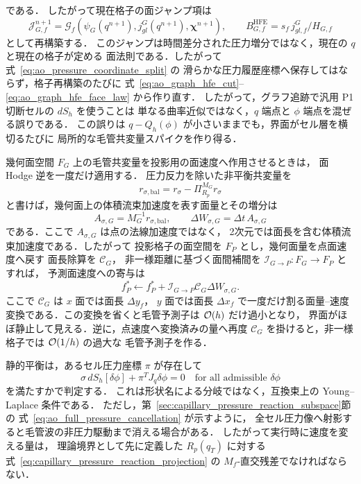 である．
したがって現在格子の面ジャンプ項は
\begin{equation}
  \mathcal{J}_{G,f}^{n+1}
  =
  \mathcal{G}_{f}\!\left(\psi_G(q^{n+1}),j_{gl}^{G}(q^{n+1}),\bm{\chi}^{n+1}\right),
  \qquad
  B_{G,f}^{\mathrm{HFE}}
  =
  s_f\,j_{gl,f}^{G}/H_{G,f}
  \label{eq:ao_graph_hfe_face_law}
\end{equation}
として再構築する．
このジャンプは時間差分された圧力増分ではなく，現在の $q$ と現在の格子が定める
面法則である．したがって式~\eqref{eq:ao_pressure_coordinate_split} の
滑らかな圧力履歴座標へ保存してはならず，格子再構築のたびに
式~\eqref{eq:ao_graph_hfe_cut}--\eqref{eq:ao_graph_hfe_face_law} から作り直す．
したがって，グラフ追跡で汎用 P1 切断セルの $dS_h$ を使うことは
単なる曲率近似ではなく，$q$ 端点と $\phi$ 端点を混ぜる誤りである．
この誤りは $q-Q_h(\phi)$ が小さいままでも，界面がセル層を横切るたびに
局所的な毛管共変量スパイクを作り得る．

幾何面空間 $F_G$ 上の毛管共変量を投影用の面速度へ作用させるときは，
面 Hodge 逆を一度だけ適用する．
圧力反力を除いた非平衡共変量を
\[
  r_{\sigma,\mathrm{bal}}
  =
  r_\sigma-\Pi_{R_p}^{M_G}r_\sigma
\]
と書けば，幾何面上の体積流束加速度を表す面量とその増分は
\begin{equation}
  A_{\sigma,G}=M_G^{-1}r_{\sigma,\mathrm{bal}},
  \qquad
  \Delta W_{\sigma,G}=\Delta t\,A_{\sigma,G}
  \label{eq:ao_hodge_divided_face_increment}
\end{equation}
である．ここで $A_{\sigma,G}$ は点の法線加速度ではなく，
2次元では面長を含む体積流束加速度である．したがって
投影格子の面空間を $F_P$ とし，幾何面量を点面速度へ戻す
面長除算を $\mathcal{C}_{G}$，
非一様距離に基づく面間補間を $\mathcal{I}_{G\to P}:F_G\to F_P$ とすれば，
予測面速度への寄与は
\begin{equation}
  f_P^* \leftarrow
  f_P^*+\mathcal{I}_{G\to P}\mathcal{C}_{G}\Delta W_{\sigma,G}.
  \label{eq:ao_projection_face_bridge}
\end{equation}
ここで $\mathcal{C}_{G}$ は $x$ 面では面長 $\Delta y_f$，
$y$ 面では面長 $\Delta x_f$ で一度だけ割る面量--速度
変換である．この変換を省くと毛管予測子は $\mathcal{O}(h)$ だけ過小となり，
界面がほぼ静止して見える．逆に，点速度へ変換済みの量へ再度
$\mathcal{C}_{G}$ を掛けると，非一様格子では $\mathcal{O}(1/h)$ の過大な
毛管予測子を作る．

静的平衡は，あるセル圧力座標 $\pi$ が存在して
\begin{equation}
  \sigma\,dS_h[\delta\phi]+\pi^T J_q\delta\phi=0
  \quad
  \text{for all admissible }\delta\phi
  \label{eq:ao_discrete_young_laplace_test}
\end{equation}
を満たすかで判定する．
これは形状名による分岐ではなく，互換束上の Young--Laplace 条件である．
ただし，第~\ref{sec:capillary_pressure_reaction_subspace}節の
式~\eqref{eq:ao_full_pressure_cancellation} が示すように，
全セル圧力像へ射影すると毛管波の非圧力駆動まで消える場合がある．
したがって実行時に速度を変える量は，
理論境界として先に定義した $R_p(q_T)$ に対する
式~\eqref{eq:capillary_pressure_reaction_projection} の
$M_f$-直交残差でなければならない．

